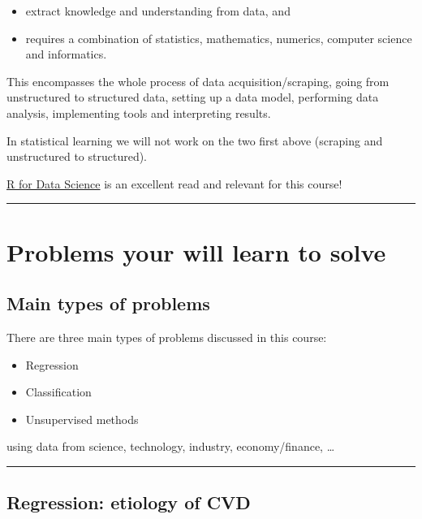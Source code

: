 \documentclass[]{article}
\providecommand{\tightlist}{%
  \setlength{\itemsep}{0pt}\setlength{\parskip}{0pt}}
\begin{document}
\begin{itemize}
\tightlist
\item
  extract knowledge and understanding from data, and
\item
  requires a combination of statistics, mathematics, numerics, computer
  science and informatics.
\end{itemize}

This encompasses the whole process of data acquisition/scraping, going
from unstructured to structured data, setting up a data model,
performing data analysis, implementing tools and interpreting results.

In statistical learning we will not work on the two first above
(scraping and unstructured to structured).

\href{http://r4ds.had.co.nz/}{R for Data Science} is an excellent read
and relevant for this course!

\begin{center}\rule{0.5\linewidth}{\linethickness}\end{center}

\hypertarget{problems-your-will-learn-to-solve}{%
\section{Problems your will learn to
solve}\label{problems-your-will-learn-to-solve}}

\hypertarget{main-types-of-problems}{%
\subsection{Main types of problems}\label{main-types-of-problems}}

There are three main types of problems discussed in this course:

\begin{itemize}
\tightlist
\item
  Regression
\item
  Classification
\item
  Unsupervised methods
\end{itemize}

using data from science, technology, industry, economy/finance, \ldots{}

\begin{center}\rule{0.5\linewidth}{\linethickness}\end{center}

\hypertarget{regression-etiology-of-cvd}{%
\subsection{Regression: etiology of
CVD}\label{regression-etiology-of-cvd}}
\end{document}
